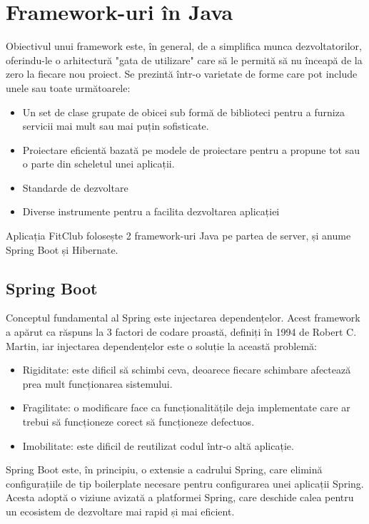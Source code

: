 \section{Framework-uri în Java}
Obiectivul unui framework este, în general, de a simplifica munca dezvoltatorilor, oferindu-le o arhitectură "gata de utilizare" care să le permită să nu înceapă de la zero la fiecare nou proiect. Se prezintă într-o varietate de forme care pot include unele sau toate următoarele:

\begin{itemize}
	\item{Un set de clase grupate de obicei sub formă de biblioteci pentru a furniza servicii mai mult sau mai puțin sofisticate.}
	\item{Proiectare eficientă bazată pe modele de proiectare pentru a propune tot sau o parte din scheletul unei aplicații.}
	\item{Standarde de dezvoltare}
	\item{Diverse instrumente pentru a facilita dezvoltarea aplicației}
	\newline
\end{itemize}

Aplicația FitClub folosește 2 framework-uri Java pe partea de server, și anume Spring Boot și Hibernate.\newline


\subsection{Spring Boot}
Conceptul fundamental al Spring este injectarea dependențelor.
Acest framework a apărut ca răspuns la 3 factori de codare proastă, definiți în 1994 de Robert C. Martin, iar injectarea dependențelor este o soluție la această problemă:

\begin{itemize}
	\item{Rigiditate: este dificil să schimbi ceva, deoarece fiecare schimbare afectează prea mult funcționarea sistemului.}
	\item{Fragilitate: o modificare face ca funcționalitățile deja implementate care ar trebui să funcționeze corect să funcționeze defectuos.}
	\item{Imobilitate: este dificil de reutilizat codul într-o altă aplicație.}
	\newline
\end{itemize}

Spring Boot este, în principiu, o extensie a cadrului Spring, care elimină configurațiile de tip boilerplate necesare pentru configurarea unei aplicații Spring. Acesta adoptă o viziune avizată a platformei Spring, care deschide calea pentru un ecosistem de dezvoltare mai rapid și mai eficient.\newline

